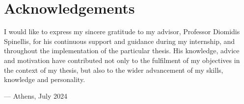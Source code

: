 \chapter*{\centering Acknowledgements}
\label{ch:acknowledgements}

I would like to express my sincere gratitude
to my advisor, Professor Diomidis Spinellis,
for his continuous support and guidance
during my internship,
and throughout the implementation
of the particular thesis.
His knowledge, advice and motivation
have contributed not only to the fulfilment
of my objectives in the context of my thesis,
but also to the wider advancement of my skills, knowledge and personality.

\vspace{1cm}

\hfill --- Athens, July 2024
